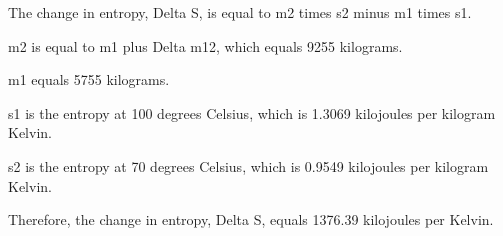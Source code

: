 The change in entropy, Delta S, is equal to m2 times s2 minus m1 times s1.

m2 is equal to m1 plus Delta m12, which equals 9255 kilograms.

m1 equals 5755 kilograms.

s1 is the entropy at 100 degrees Celsius, which is 1.3069 kilojoules per kilogram Kelvin.

s2 is the entropy at 70 degrees Celsius, which is 0.9549 kilojoules per kilogram Kelvin.

Therefore, the change in entropy, Delta S, equals 1376.39 kilojoules per Kelvin.